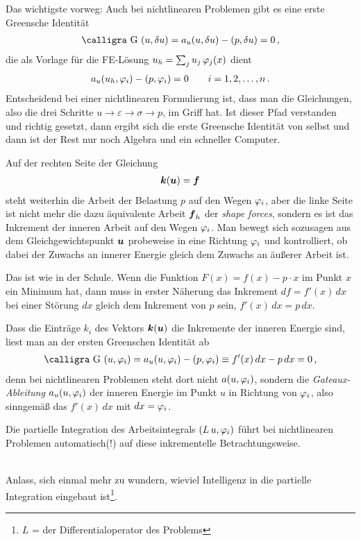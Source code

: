 Das wichtigste vorweg: Auch bei nichtlinearen Problemen gibt es eine erste Greensche Identit\"{a}t
\begin{align}
\text{\normalfont\calligra G\,\,}(u,\delta u) = a_u(u,\delta u) - (p, \delta u) = 0 \,,
\end{align}
die als Vorlage f\"{u}r die FE-L\"{o}sung $u_h = \sum_j u_j\,\varphi_j(x)$ dient
\begin{align}
a_u(u_h,\varphi_i) - (p,\varphi_i) = 0 \qquad i = 1,2, \ldots, n\,.
\end{align}
Entscheidend bei einer nichtlinearen Formulierung ist, dass man die Gleichungen, also die drei Schritte  $u \to \varepsilon \to \sigma \to p$, im Griff hat. Ist dieser Pfad verstanden und richtig gesetzt, dann ergibt sich die erste Greensche Identit\"{a}t von selbst und dann ist der Rest nur noch Algebra und ein schneller Computer.

Auf der rechten Seite der Gleichung
\begin{align}
\mbox{\boldmath $k$}(\mbox{\boldmath $u$}) = \mbox{\boldmath $f$}
\end{align}
steht weiterhin die Arbeit der Belastung $p$ auf den Wegen $\varphi_i $, aber die linke Seite ist nicht mehr die dazu \"{a}quivalente Arbeit $\mbox{\boldmath $f$}_h$ der {\em shape forces\/}, sondern es ist das Inkrement der inneren Arbeit auf den Wegen $\varphi_i $. Man bewegt sich sozusagen aus dem Gleichgewichtspunkt $\mbox{\boldmath $u$} $ probeweise in eine Richtung $\varphi_i$ und kontrolliert, ob dabei der Zuwachs an innerer Energie gleich dem Zuwachs an \"{a}u{\ss}erer Arbeit ist.

Das ist wie in der Schule. Wenn die Funktion $F(x) = f(x) - p \cdot x $ im Punkt $x $ ein Minimum hat, dann muss in erster N\"{a}herung das Inkrement $df = f'(x)\,dx$ bei einer St\"{o}rung $dx $  gleich dem Inkrement von $p$ sein, $f'(x)\,dx = p\,dx$.

Dass die Eintr\"{a}ge $k_i$ des Vektors $\mbox{\boldmath $k$}(\mbox{\boldmath $u$})$ die Inkremente der inneren Energie sind, liest man an der ersten Greenschen Identit\"{a}t ab
\begin{align}
\text{\normalfont\calligra G\,\,}(u,\Np_i) = a_u(u,\Np_i) - (p, \Np_i) \equiv f'(x)\,dx - p\,dx = 0\,,
\end{align}
denn bei nichtlinearen Problemen steht dort nicht $ a(u,\varphi_i)$, sondern die {\em Gateaux-Ableitung\/} $a_u(u,\varphi_i)$ der inneren Energie im Punkt $u$ in  Richtung von $\varphi_i$, also sinngem\"{a}{\ss} das $f'(x)\,dx$ mit $dx = \varphi_i$.

\hspace*{-12pt}\colorbox{highlightBlue}{\parbox{0.98\textwidth}{Die partielle Integration des Arbeitsintegrals $(L\,u,\varphi_i)$ f\"{u}hrt bei nichtlinearen Problemen automatisch(!) auf diese inkrementelle Betrachtungsweise.}}\\
Anlass, sich einmal mehr zu wundern, wieviel Intelligenz in die partielle Integration eingebaut ist\footnote{$L$ = der Differentialoperator des Problems}.

